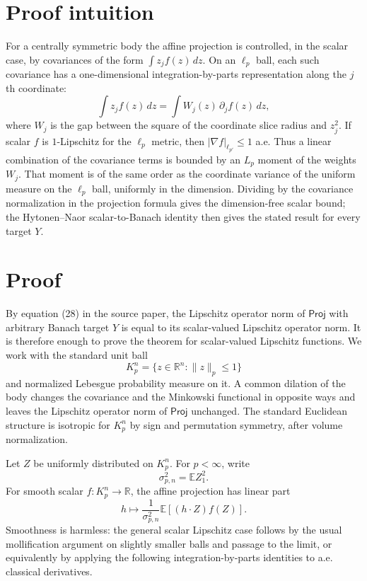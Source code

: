 \documentclass[11pt]{article}
\newcommand{\R}{\mathbb{R}}
\newcommand{\E}{\mathbb{E}}
\newcommand{\Proj}{\mathsf{Proj}}
\begin{document}
\section*{Proof intuition}

For a centrally symmetric body the affine projection is controlled, in the scalar case, by covariances of the form $\int z_j f(z)\,dz$.  On an $\ell_p$ ball, each such covariance has a one-dimensional integration-by-parts representation along the $j$th coordinate:
\[
\int z_j f(z)\,dz=\int W_j(z)\,\partial_j f(z)\,dz,
\]
where $W_j$ is the gap between the square of the coordinate slice radius and $z_j^2$.  If scalar $f$ is $1$-Lipschitz for the $\ell_p$ metric, then $|\nabla f|_{\ell_{p'}}\le 1$ a.e.  Thus a linear combination of the covariance terms is bounded by an $L_p$ moment of the weights $W_j$.  That moment is of the same order as the coordinate variance of the uniform measure on the $\ell_p$ ball, uniformly in the dimension.  Dividing by the covariance normalization in the projection formula gives the dimension-free scalar bound; the Hytonen--Naor scalar-to-Banach identity then gives the stated result for every target $Y$.

\section*{Proof}

By equation (28) in the source paper, the Lipschitz operator norm of $\Proj$ with arbitrary Banach target $Y$ is equal to its scalar-valued Lipschitz operator norm.  It is therefore enough to prove the theorem for scalar-valued Lipschitz functions.  We work with the standard unit ball
\[
K_p^n=\{z\in\R^n:\|z\|_p\le 1\}
\]
and normalized Lebesgue probability measure on it.  A common dilation of the body changes the covariance and the Minkowski functional in opposite ways and leaves the Lipschitz operator norm of $\Proj$ unchanged.  The standard Euclidean structure is isotropic for $K_p^n$ by sign and permutation symmetry, after volume normalization.

Let $Z$ be uniformly distributed on $K_p^n$.  For $p<\infty$, write
\[
\sigma_{p,n}^2=\E Z_1^2.
\]
For smooth scalar $f:K_p^n\to \R$, the affine projection has linear part
\[
h\mapsto \frac{1}{\sigma_{p,n}^2}\E[(h\cdot Z)f(Z)].
\]
Smoothness is harmless: the general scalar Lipschitz case follows by the usual mollification argument on slightly smaller balls and passage to the limit, or equivalently by applying the following integration-by-parts identities to a.e. classical derivatives.
\end{document}
